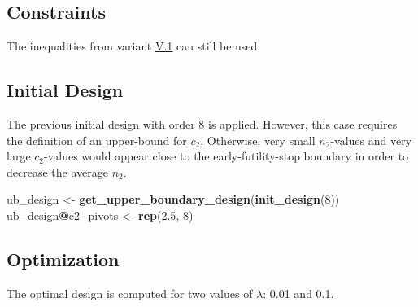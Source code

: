 \documentclass[]{book}
\newenvironment{Shaded}{\begin{snugshade}}{\end{snugshade}}
\newcommand{\DataTypeTok}[1]{\textcolor[rgb]{0.13,0.29,0.53}{#1}}
\newcommand{\DecValTok}[1]{\textcolor[rgb]{0.00,0.00,0.81}{#1}}
\newcommand{\FloatTok}[1]{\textcolor[rgb]{0.00,0.00,0.81}{#1}}
\newcommand{\KeywordTok}[1]{\textcolor[rgb]{0.13,0.29,0.53}{\textbf{#1}}}
\newcommand{\NormalTok}[1]{#1}
\newcommand{\OperatorTok}[1]{\textcolor[rgb]{0.81,0.36,0.00}{\textbf{#1}}}
\newcommand{\StringTok}[1]{\textcolor[rgb]{0.31,0.60,0.02}{#1}}
\begin{document}
\hypertarget{constraints-13}{%
\subsection{Constraints}\label{constraints-13}}

The inequalities from variant \protect\hyperlink{variantV_1}{V.1} can still be used.

\hypertarget{initial-design-11}{%
\subsection{Initial Design}\label{initial-design-11}}

The previous initial design with order \(8\) is applied.
However, this case requires the definition of an upper-bound for \(c_2\).
Otherwise, very small \(n_2\)-values and very large \(c_2\)-values would
appear close to the early-futility-stop boundary in order to
decrease the average \(n_2\).

\begin{Shaded}
\begin{Highlighting}[]
\NormalTok{ub_design <-}\StringTok{ }\KeywordTok{get_upper_boundary_design}\NormalTok{(}\KeywordTok{init_design}\NormalTok{(}\DecValTok{8}\NormalTok{))}
\NormalTok{ub_design}\OperatorTok{@}\NormalTok{c2_pivots <-}\StringTok{ }\KeywordTok{rep}\NormalTok{(}\FloatTok{2.5}\NormalTok{, }\DecValTok{8}\NormalTok{)}
\end{Highlighting}
\end{Shaded}

\hypertarget{optimization-12}{%
\subsection{Optimization}\label{optimization-12}}

The optimal design is computed for two values of \(\lambda\): 0.01 and 0.1.

\begin{Shaded}
\end{Shaded}
\end{document}
